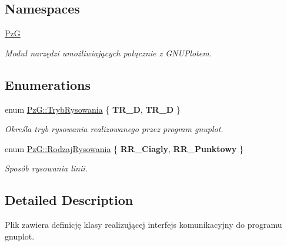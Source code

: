 \subsection*{Namespaces}
\begin{DoxyCompactItemize}
\item 
 \hyperlink{namespace_pz_g}{Pz\+G}
\begin{DoxyCompactList}\small\item\em Moduł narzędzi umożliwiających połącznie z G\+N\+U\+Plotem. \end{DoxyCompactList}\end{DoxyCompactItemize}
\subsection*{Enumerations}
\begin{DoxyCompactItemize}
\item 
enum \hyperlink{namespace_pz_g_aeedae1ef10c66d720f9e89de408ca4ca}{Pz\+G\+::\+Tryb\+Rysowania} \{ {\bfseries T\+R\+\_\+D}, 
{\bfseries T\+R\+\_\+D}
 \}
\begin{DoxyCompactList}\small\item\em Określa tryb rysowania realizowanego przez program {\ttfamily gnuplot}. \end{DoxyCompactList}\item 
enum \hyperlink{namespace_pz_g_a705c92106f39b7d0c34a6739d10ff0b6}{Pz\+G\+::\+Rodzaj\+Rysowania} \{ {\bfseries R\+R\+\_\+\+Ciagly}, 
{\bfseries R\+R\+\_\+\+Punktowy}
 \}
\begin{DoxyCompactList}\small\item\em Sposób rysowania linii. \end{DoxyCompactList}\end{DoxyCompactItemize}


\subsection{Detailed Description}
Plik zawiera definicję klasy realizującej interfejs komunikacyjny do programu gnuplot. 
